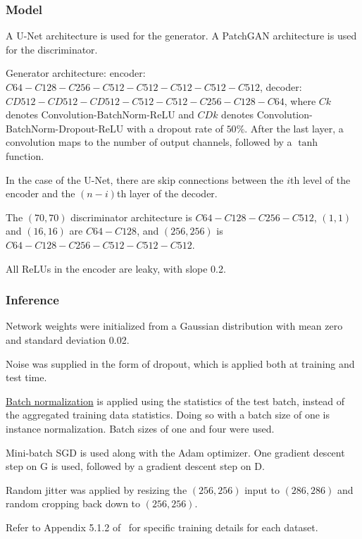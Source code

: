 \documentclass[a4paper, 12pt]{article}
\begin{document}
\subsubsection{Model}

A U-Net\cite{DBLP:journals/corr/RonnebergerFB15} architecture is used for the
generator. A PatchGAN architecture\cite{DBLP:journals/corr/LiW16b} is used for
the discriminator.

Generator architecture: encoder: $C64-C128-C256-C512-C512-C512-C512-C512$,
decoder: $CD512-CD512-CD512-C512-C512-C256-C128-C64$, where $Ck$ denotes
Convolution-BatchNorm-ReLU and $CDk$ denotes
Convolution-BatchNorm-Dropout-ReLU with a dropout rate of $50\%$. After the
last layer, a convolution maps to the number of output channels, followed by a
$\tanh$ function.

In the case of the U-Net, there are skip connections between the $i$th level of
the encoder and the $(n - i)$th layer of the decoder.

The $(70, 70)$ discriminator architecture is $C64-C128-C256-C512$, $(1, 1)$ and
$(16, 16)$ are $C64-C128$, and $(256, 256)$ is $C64-C128-C256-C512-C512-C512$.

All ReLUs in the encoder are leaky, with slope 0.2.

\subsubsection{Inference}

Network weights were initialized from a Gaussian distribution with mean zero
and standard deviation 0.02.

Noise was supplied in the form of dropout, which is applied both at training
and test time.

\hyperref[batchnorm]{Batch normalization} is applied using the statistics of
the test batch, instead of the aggregated training data statistics. Doing so
with a batch size of one is instance
normalization\cite{DBLP:journals/corr/UlyanovVL16}. Batch sizes of one and four
were used.

Mini-batch SGD is used along with the Adam optimizer. One gradient descent step
on G is used, followed by a gradient descent step on D.

Random jitter was applied by resizing the $(256, 256)$ input to $(286, 286)$
and random cropping back down to $(256, 256)$.

Refer to Appendix 5.1.2 of~\cite{DBLP:journals/corr/IsolaZZE16} for specific
training details for each dataset.
\end{document}
